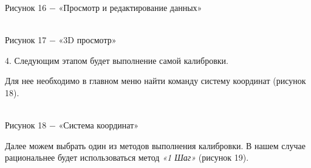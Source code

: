 \documentclass[a4paper]{article}
\begin{document}
{\begin{center}
    Рисунок 16 $-$ «Просмотр и редактирование данных»  
\end{center}
\begin{center}
    \\
    Рисунок 17 $-$ «3D просмотр»  
\end{center}
\hfill \break
\par 4. Следующим этапом будет выполнение самой калибровки. 
\par Для нее необходимо в главном меню найти команду систему координат (рисунок 18).
\begin{center}
    \\
    Рисунок 18 $-$ «Система координат»  
\end{center}
\par Далее можем выбрать один из методов выполнения калибровки. В нашем случае рациональнее будет использоваться метод \textit{«1 Шаг»} (рисунок 19). 
\begin{center}
    \\

\end{center}}
\end{document}
